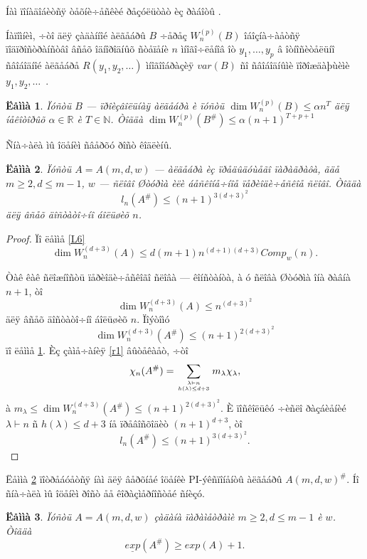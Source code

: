 \documentclass{article}
\numberwithin{equation}{section}
\theoremstyle{plain}
\newtheorem{lemma}{Ëåììà}[section]
\theoremstyle{definition}
\newtheorem{proof}{Äîêàçàòåëüñòâî}
\begin{document}
\begin{fulltext}
Íàì ïîíàäîáèòñÿ òåõíè÷åñêèé ðåçóëüòàò èç ðàáîòû \cite{RZ}.

Íàïîìíèì, ÷òî äëÿ çàäàííîé àëãåáðû $B$ ÷åðåç $W_n^{(p)}(B)$ îáîçíà÷àåòñÿ ïîäïðîñòðàíñòâî âñåõ îäíîðîäíûõ ñòåïåíè $n$ ìíîãî÷ëåíîâ îò $y_1,\ldots, y_p$ â îòíîñèòåëüíî  ñâîáîäíîé àëãåáðå
$R(y_1,y_2,\ldots)$ ìíîãîîáðàçèÿ $var(B)$ ñî ñâîáîäíûìè ïîðîæäàþùèìè $y_1,y_2,\ldots$~.

\begin{lemma}\label{LL1}\cite[ëåììà 6]{RZ}
Ïóñòü $B$ --- ïðîèçâîëüíàÿ àëãåáðà è ïóñòü $\dim W_n^{(p)}(B) \le\alpha n^T$ äëÿ íåêîòîðûõ
$\alpha\in\mathbb{R}$ è $T\in \mathbb{N}$. Òîãäà 
$\dim W_n^{(p)}(B^\#) \le\alpha(n+1)^{T+p+1}$ 
\end{lemma}

Ñíà÷àëà ìû îöåíèì ñâåðõó ðîñò êîäëèíû.

\begin{lemma}\label{LL2}
Ïóñòü $A=A(m,d,w)$ --- àëãåáðà èç ïðåäûäóùåãî ïàðàãðàôà, ãäå $m\ge 2, d\le m-1$, $w$ --- 
ñëîâî Øòóðìà èëè áåñêîíå÷íîå ïåðèîäè÷åñêîå ñëîâî. Òîãäà
$$
l_n(A^\#)\le (n+1)^{3(d+3)^2}
$$
äëÿ âñåõ äîñòàòî÷íî áîëüøèõ $n$.
\end{lemma}

\begin{proof}

Ïî ëåììå \ref{L6}
$$
\dim W_n^{(d+3)}(A) \le d(m+1)n^{(d+1)(d+3)}Comp_w(n).
$$

Òàê êàê ñëîæíîñòü ïåðèîäè÷åñêîãî ñëîâà --- êîíñòàíòà, à ó ñëîâà Øòóðìà îíà ðàâíà $n+1$, òî
$$
\dim W_n^{(d+3)}(A) \le n^{(d+3)^2}
$$
äëÿ âñåõ äîñòàòî÷íî áîëüøèõ $n$. Ïîýòîìó
$$
\dim W_n^{(d+3)}(A^\#) \le (n+1)^{2(d+3)^2}
$$
ïî ëåììå  \ref{LL1}. Èç çàìå÷àíèÿ \ref{r1} âûòåêàåò, ÷òî
$$
\chi_n(A^\#)=\sum_{{\lambda\vdash n\atop h(\lambda)\le d+3}} m_\lambda\chi_\lambda,
$$
à $m_\lambda\le \dim W_n^{(d+3)}(A^\#) \le (n+1)^{2(d+3)^2}$. È ïîñêîëüêó ÷èñëî ðàçáèåíèé
$\lambda\vdash n$ ñ $h(\lambda) \le d+3$ íå ïðåâîñõîäèò $(n+1)^{d+3}$, òî
$$
l_n(A^\#) \le (n+1)^{3(d+3)^2}.
$$ 
 \end{proof}

Ëåììà \ref{LL2} ïîòðåáóåòñÿ íàì äëÿ âåðõíåé îöåíêè PI-ýêñïîíåíòû àëãåáðû $A(m,d,w)^\#$.
Íî ñíà÷àëà ìû îöåíèì ðîñò åå êîðàçìåðíîñòåé ñíèçó.

\begin{lemma}\label{LL3}
Ïóñòü $A=A(m,d,w)$ çàäàíà ïàðàìåòðàìè $m\ge 2, d\le m-1$ è $w$. Òîãäà
$$
\underline{exp}(A^\#) \ge exp(A)+1.
$$
\end{lemma}


\end{fulltext}
\end{document}

